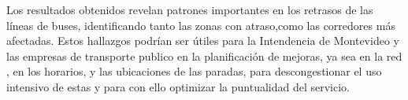 \documentclass[journal]{IEEEtran}
\begin{document}
Los resultados obtenidos revelan patrones importantes en los retrasos de las líneas de buses, identificando tanto las zonas con atraso,como las corredores más afectadas. Estos hallazgos podrían ser útiles para la Intendencia de Montevideo y las empresas de transporte publico en la planificación de mejoras, ya sea en la red , en los horarios, y las ubicaciones de las paradas, para descongestionar el uso intensivo de estas y para con ello optimizar la puntualidad del servicio.


%





\end{document}
